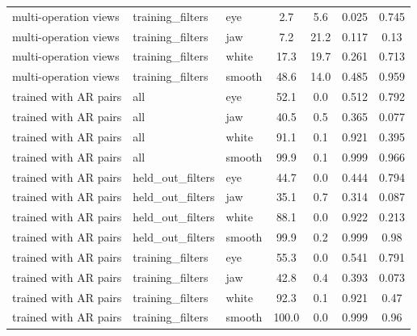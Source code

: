 \begin{tabular}{@{}l l l cc cc@{}}
multi-operation views & training\_filters & eye & 2.7 & 5.6 & 0.025 & 0.745 \\
multi-operation views & training\_filters & jaw & 7.2 & 21.2 & 0.117 & 0.13 \\
multi-operation views & training\_filters & white & 17.3 & 19.7 & 0.261 & 0.713 \\
multi-operation views & training\_filters & smooth & 48.6 & 14.0 & 0.485 & 0.959 \\
trained with AR pairs & all & eye & 52.1 & 0.0 & 0.512 & 0.792 \\
trained with AR pairs & all & jaw & 40.5 & 0.5 & 0.365 & 0.077 \\
trained with AR pairs & all & white & 91.1 & 0.1 & 0.921 & 0.395 \\
trained with AR pairs & all & smooth & 99.9 & 0.1 & 0.999 & 0.966 \\
trained with AR pairs & held\_out\_filters & eye & 44.7 & 0.0 & 0.444 & 0.794 \\
trained with AR pairs & held\_out\_filters & jaw & 35.1 & 0.7 & 0.314 & 0.087 \\
trained with AR pairs & held\_out\_filters & white & 88.1 & 0.0 & 0.922 & 0.213 \\
trained with AR pairs & held\_out\_filters & smooth & 99.9 & 0.2 & 0.999 & 0.98 \\
trained with AR pairs & training\_filters & eye & 55.3 & 0.0 & 0.541 & 0.791 \\
trained with AR pairs & training\_filters & jaw & 42.8 & 0.4 & 0.393 & 0.073 \\
trained with AR pairs & training\_filters & white & 92.3 & 0.1 & 0.921 & 0.47 \\
trained with AR pairs & training\_filters & smooth & 100.0 & 0.0 & 0.999 & 0.96 \\
\bottomrule
\end{tabular}
